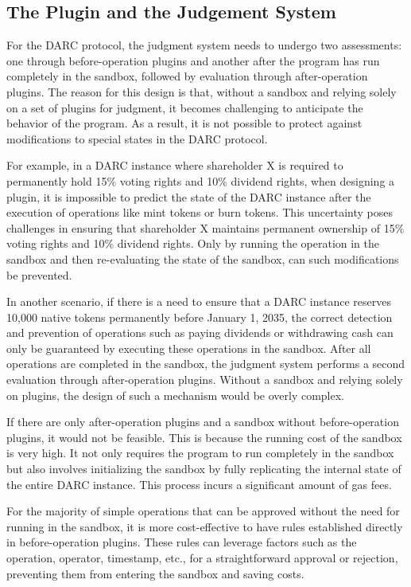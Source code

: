 \documentclass[main.tex]{subfiles}
\begin{document}
\subsection{The Plugin and the Judgement System}

For the DARC protocol, the judgment system needs to undergo two assessments: one through before-operation plugins and another after the program has run completely in the sandbox, followed by evaluation through after-operation plugins. The reason for this design is that, without a sandbox and relying solely on a set of plugins for judgment, it becomes challenging to anticipate the behavior of the program. As a result, it is not possible to protect against modifications to special states in the DARC protocol.

For example, in a DARC instance where shareholder X is required to permanently hold 15\% voting rights and 10\% dividend rights, when designing a plugin, it is impossible to predict the state of the DARC instance after the execution of operations like mint tokens or burn tokens. This uncertainty poses challenges in ensuring that shareholder X maintains permanent ownership of 15\% voting rights and 10\% dividend rights. Only by running the operation in the sandbox and then re-evaluating the state of the sandbox, can such modifications be prevented.

In another scenario, if there is a need to ensure that a DARC instance reserves 10,000 native tokens permanently before January 1, 2035, the correct detection and prevention of operations such as paying dividends or withdrawing cash can only be guaranteed by executing these operations in the sandbox. After all operations are completed in the sandbox, the judgment system performs a second evaluation through after-operation plugins. Without a sandbox and relying solely on plugins, the design of such a mechanism would be overly complex.


If there are only after-operation plugins and a sandbox without before-operation plugins, it would not be feasible. This is because the running cost of the sandbox is very high. It not only requires the program to run completely in the sandbox but also involves initializing the sandbox by fully replicating the internal state of the entire DARC instance. This process incurs a significant amount of gas fees.

For the majority of simple operations that can be approved without the need for running in the sandbox, it is more cost-effective to have rules established directly in before-operation plugins. These rules can leverage factors such as the operation, operator, timestamp, etc., for a straightforward approval or rejection, preventing them from entering the sandbox and saving costs.
\end{document}
